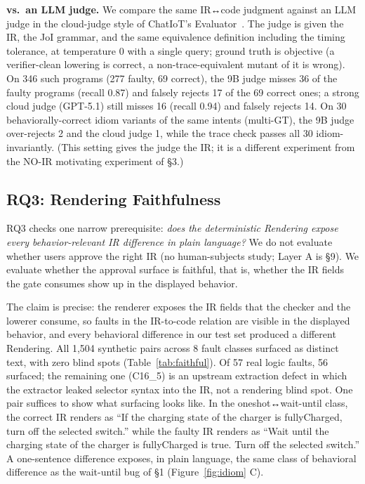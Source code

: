 \documentclass[sigconf,nonacm,anonymous,review]{acmart}
\begin{document}
\textbf{vs.\ an LLM judge.} We compare the same IR↔code judgment against an LLM judge in the cloud-judge style of ChatIoT's Evaluator~\cite{chatiot}. The judge is given the IR, the JoI grammar, and the same equivalence definition including the timing tolerance, at temperature 0 with a single query; ground truth is objective (a verifier-clean lowering is correct, a non-trace-equivalent mutant of it is wrong). On 346 such programs (277 faulty, 69 correct), the 9B judge misses 36 of the faulty programs (recall 0.87) and falsely rejects 17 of the 69 correct ones; a strong cloud judge (GPT-5.1) still misses 16 (recall 0.94) and falsely rejects 14. On 30 behaviorally-correct idiom variants of the same intents (multi-GT), the 9B judge over-rejects 2 and the cloud judge 1, while the trace check passes all 30 idiom-invariantly. (This setting gives the judge the IR; it is a different experiment from the NO-IR motivating experiment of \S3.)

\subsection{RQ3: Rendering Faithfulness}

RQ3 checks one narrow prerequisite: \emph{does the deterministic Rendering expose every behavior-relevant IR difference in plain language?} We do not evaluate whether users approve the right IR (no human-subjects study; Layer A is \S9). We evaluate whether the approval surface is faithful, that is, whether the IR fields the gate consumes show up in the displayed behavior.

The claim is precise: the renderer exposes the IR fields that the checker and the lowerer consume, so faults in the IR-to-code relation are visible in the displayed behavior, and every behavioral difference in our test set produced a different Rendering. All 1,504 synthetic pairs across 8 fault classes surfaced as distinct text, with zero blind spots (Table~\ref{tab:faithful}). Of 57 real logic faults, 56 surfaced; the remaining one (C16\_5) is an upstream extraction defect in which the extractor leaked selector syntax into the IR, not a rendering blind spot. One pair suffices to show what surfacing looks like. In the oneshot↔wait-until class, the correct IR renders as ``If the charging state of the charger is fullyCharged, turn off the selected switch.'' while the faulty IR renders as ``Wait until the charging state of the charger is fullyCharged is true. Turn off the selected switch.'' A one-sentence difference exposes, in plain language, the same class of behavioral difference as the wait-until bug of \S1 (Figure~\ref{fig:idiom} C).
\end{document}
